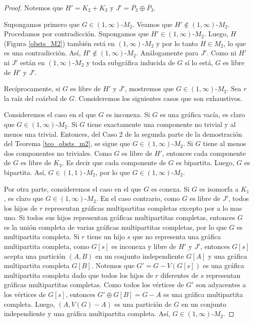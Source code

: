 \begin{proof}

Notemos que $H'=K_2 + K_3$ y $J'=\overline{P_3} \oplus \overline{P_3}$.

Supongamos primero que $G \in (1,\infty)$-$M_2$. Veamos que $H'\notin (1,\infty)$-$M_2$. Procedamos por contradicción. Supongamos que $H' \in (1,\infty)$-$M_2$. Luego, $H$ (Figura \ref{obsts_M2}) también está en $(1,\infty)$-$M_2$ y por lo tanto $H\in M_2$, lo que es una contradicción. Así,  $H'\notin (1,\infty)$-$M_2$. Análogamente para $J'$. Como ni $H'$ ni $J'$ están en $(1,\infty)$-$M_2$ y toda subgráfica inducida de $G$ sí lo está, $G$ es libre de $H'$ y $J'$.

Recíprocamente, si $G$ es libre de $H'$ y $J'$, mostremos que $G\in (1,\infty)$-$M_2$. Sea $r$ la raíz del coárbol de $G$. Consideremos los siguientes casos que son exhaustivos.

Consideremos el caso en el que $G$ es inconexa. Si $G$ es una gráfica vacía, es claro que $G \in (1,\infty)$-$M_2$. Si $G$ tiene exactamente una componente no trivial y al menos una trivial. Entonces, del Caso 2 de la segunda parte de la demostración del Teorema \ref{teo_obsts_m2}, se sigue que $G \in (1,\infty)$-$M_2$. Si $G$ tiene al menos dos componentes no triviales. Como $G$ es libre de $H'$, entonces cada componente de $G$ es libre de $K_3$. Es decir que cada componente de $G$ es bipartita. Luego, $G$ es bipartita. Así, $G \in (1,1)$-$M_2$, por lo que $G \in (1,\infty)$-$M_2$. 

Por otra parte, consideremos el caso en el que $G$ es conexa.  Si $G$ es isomorfa a $K_1$, es claro que $G \in (1,\infty)$-$M_2$. En el caso contrario, como $G$ es libre de $J'$, todos los hijos de $r$ representan gráficas multipartitas completas excepto por a lo mas uno. Si todos sus hijos representan gráficas multipartitas completas, entonces $G$ es la unión completa de varias gráficas multipartitas completas, por lo que $G$ es multipartita completa. Si $r$ tiene un hijo $s$ que no representa una gráfica multipartita completa, como $G[s]$ es inconexa y libre de $H'$ y $J'$, entonces $G[s]$ acepta una partición $(A,B)$ en un conjunto independiente $G[A]$ y una gráfica multipartita completa $G[B]$. Notemos que $G' = G-V(G[s])$ es una gráfica multipartita completa dado que todos los hijos de $r$ diferentes de $s$ representan gráficas multipartitas completas. Como todos los vértices de $G'$ son adyacentes a los vértices de $G[s]$, entonces $G'\oplus G[B]=G-A$ es una gráfica multipartita completa. Luego, $(A,V(G)-A)$ es una partición de $G$ en un conjunto independiente y una gráfica multipartita completa. Así, $G \in (1,\infty)$-$M_2$.

\end{proof}
